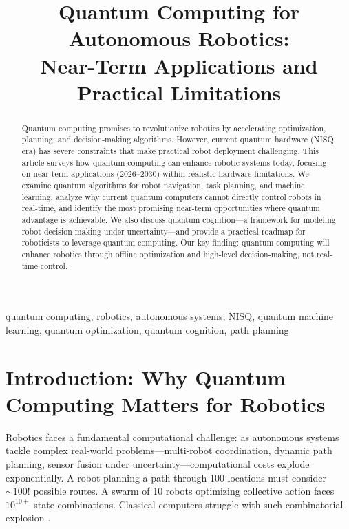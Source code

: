 \documentclass[conference]{IEEEtran}
\begin{document}
\title{Quantum Computing for Autonomous Robotics:\\Near-Term Applications and Practical Limitations}

\author{
}

\maketitle

\begin{abstract}
Quantum computing promises to revolutionize robotics by accelerating optimization, planning, and decision-making algorithms. However, current quantum hardware (NISQ era) has severe constraints that make practical robot deployment challenging. This article surveys how quantum computing can enhance robotic systems today, focusing on near-term applications (2026--2030) within realistic hardware limitations. We examine quantum algorithms for robot navigation, task planning, and machine learning, analyze why current quantum computers cannot directly control robots in real-time, and identify the most promising near-term opportunities where quantum advantage is achievable. We also discuss quantum cognition---a framework for modeling robot decision-making under uncertainty---and provide a practical roadmap for roboticists to leverage quantum computing. Our key finding: quantum computing will enhance robotics through offline optimization and high-level decision-making, not real-time control.
\end{abstract}

\begin{IEEEkeywords}
quantum computing, robotics, autonomous systems, NISQ, quantum machine learning, quantum optimization, quantum cognition, path planning
\end{IEEEkeywords}

\section{Introduction: Why Quantum Computing Matters for Robotics}

Robotics faces a fundamental computational challenge: as autonomous systems tackle complex real-world problems---multi-robot coordination, dynamic path planning, sensor fusion under uncertainty---computational costs explode exponentially. A robot planning a path through 100 locations must consider $\sim100!$ possible routes. A swarm of 10 robots optimizing collective action faces $10^{10+}$ state combinations. Classical computers struggle with such combinatorial explosion \cite{b1, b2, b3}.
\end{document}
